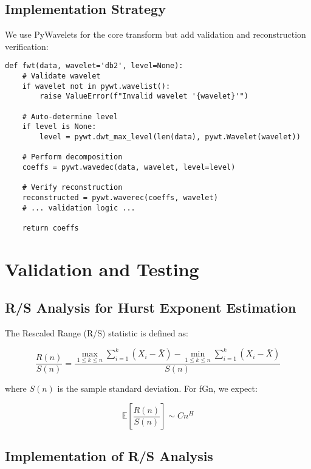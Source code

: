 \documentclass[11pt,a4paper]{article}
\begin{document}
\subsection{Implementation Strategy}

We use PyWavelets for the core transform but add validation and reconstruction verification:

\begin{lstlisting}
def fwt(data, wavelet='db2', level=None):
    # Validate wavelet
    if wavelet not in pywt.wavelist():
        raise ValueError(f"Invalid wavelet '{wavelet}'")
    
    # Auto-determine level
    if level is None:
        level = pywt.dwt_max_level(len(data), pywt.Wavelet(wavelet))
    
    # Perform decomposition
    coeffs = pywt.wavedec(data, wavelet, level=level)
    
    # Verify reconstruction
    reconstructed = pywt.waverec(coeffs, wavelet)
    # ... validation logic ...
    
    return coeffs
\end{lstlisting}

\section{Validation and Testing}

\subsection{R/S Analysis for Hurst Exponent Estimation}

The Rescaled Range (R/S) statistic is defined as:

\begin{equation}
\frac{R(n)}{S(n)} = \frac{\max_{1 \leq k \leq n} \sum_{i=1}^k (X_i - \bar{X}) - \min_{1 \leq k \leq n} \sum_{i=1}^k (X_i - \bar{X})}{S(n)}
\end{equation}

where $S(n)$ is the sample standard deviation. For fGn, we expect:

\begin{equation}
\mathbb{E}\left[\frac{R(n)}{S(n)}\right] \sim C n^H
\end{equation}

\subsection{Implementation of R/S Analysis}
\end{document}
